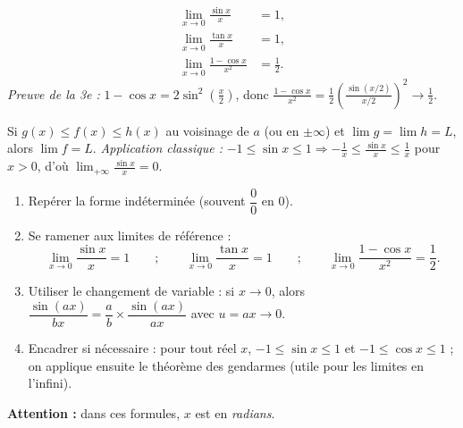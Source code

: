 \documentclass[11pt]{article}
\newcommand{\cle}[1]{{\popxbold\color{popdark}#1}}
\begin{document}
\begin{propriete}
\begin{align*}
\lim_{x \to 0} \frac{\sin x}{x} &= 1, \\
\lim_{x \to 0} \frac{\tan x}{x} &= 1, \\
\lim_{x \to 0} \frac{1 - \cos x}{x^2} &= \frac{1}{2}.
\end{align*}
\emph{Preuve de la 3e :} $1-\cos x = 2\sin^2(\frac{x}{2})$, donc $\frac{1-\cos x}{x^2} = \frac{1}{2}\left(\frac{\sin(x/2)}{x/2}\right)^2 \to \frac{1}{2}$.
\end{propriete}

\begin{propriete}
Si $g(x) \leq f(x) \leq h(x)$ au voisinage de $a$ (ou en $\pm\infty$) et $\lim g = \lim h = L$, alors $\lim f = L$.
\emph{Application classique :} $-1 \leq \sin x \leq 1 \Rightarrow -\frac{1}{x} \leq \frac{\sin x}{x} \leq \frac{1}{x}$ pour $x>0$, d'où $\lim_{+\infty} \frac{\sin x}{x} = 0$.
\end{propriete}

\begin{methode}
\begin{enumerate}
\item \cle{Repérer la forme indéterminée} (souvent $\dfrac{0}{0}$ en $0$).
\item \cle{Se ramener aux limites de référence} :
\[ \lim_{x\to 0}\frac{\sin x}{x}=1 \qquad ; \qquad \lim_{x\to 0}\frac{\tan x}{x}=1 \qquad ; \qquad \lim_{x\to 0}\frac{1-\cos x}{x^2}=\frac{1}{2}. \]
\item \cle{Utiliser le changement de variable} : si $x\to 0$, alors $\dfrac{\sin(ax)}{bx}=\dfrac{a}{b}\times\dfrac{\sin(ax)}{ax}$ avec $u=ax\to 0$.
\item \cle{Encadrer si nécessaire} : pour tout réel $x$, $-1\leq\sin x\leq 1$ et $-1\leq\cos x\leq 1$ ; on applique ensuite le théorème des gendarmes (utile pour les limites en l'infini).
\end{enumerate}
\textbf{Attention :} dans ces formules, $x$ est en \emph{radians}.
\end{methode}
\end{document}
